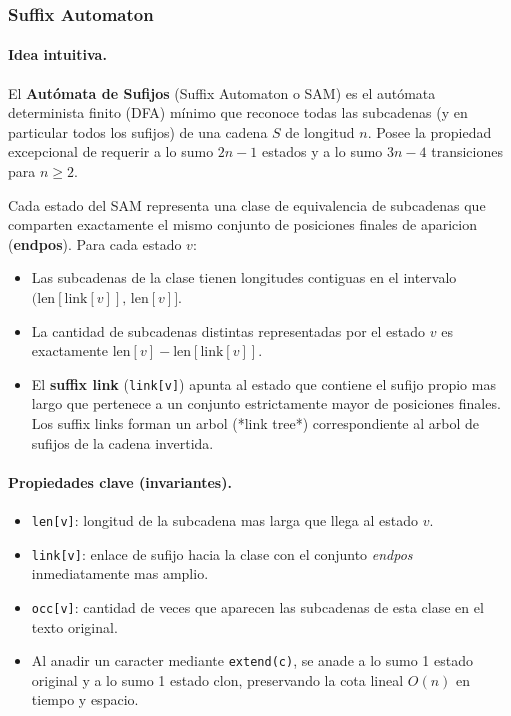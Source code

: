 \subsubsection{Suffix Automaton}

\paragraph{Idea intuitiva.}
El \textbf{Autómata de Sufijos} (Suffix Automaton o SAM) es el autómata determinista finito (DFA) mínimo que reconoce todas las subcadenas (y en particular todos los sufijos) de una cadena $S$ de longitud $n$. Posee la propiedad excepcional de requerir a lo sumo $2n - 1$ estados y a lo sumo $3n - 4$ transiciones para $n \ge 2$.

Cada estado del SAM representa una clase de equivalencia de subcadenas que comparten exactamente el mismo conjunto de posiciones finales de aparicion (\textbf{endpos}). Para cada estado $v$:
\begin{itemize}\setlength\itemsep{0pt}
	\item Las subcadenas de la clase tienen longitudes contiguas en el intervalo $(\text{len}[\text{link}[v]], \, \text{len}[v]]$.
	\item La cantidad de subcadenas distintas representadas por el estado $v$ es exactamente $\text{len}[v] - \text{len}[\text{link}[v]]$.
	\item El \textbf{suffix link} (\verb|link[v]|) apunta al estado que contiene el sufijo propio mas largo que pertenece a un conjunto estrictamente mayor de posiciones finales. Los suffix links forman un arbol (*link tree*) correspondiente al arbol de sufijos de la cadena invertida.
\end{itemize}

\paragraph{Propiedades clave (invariantes).}
\begin{itemize}\setlength\itemsep{0pt}
	\item \texttt{len[v]}: longitud de la subcadena mas larga que llega al estado $v$.
	\item \texttt{link[v]}: enlace de sufijo hacia la clase con el conjunto \textit{endpos} inmediatamente mas amplio.
	\item \texttt{occ[v]}: cantidad de veces que aparecen las subcadenas de esta clase en el texto original.
	\item Al anadir un caracter mediante \verb|extend(c)|, se anade a lo sumo 1 estado original y a lo sumo 1 estado clon, preservando la cota lineal $O(n)$ en tiempo y espacio.
\end{itemize}

